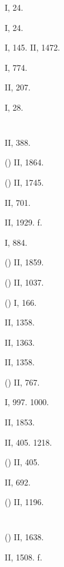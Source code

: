  I, 24.

 I, 24.

 I, 145. II, 1472.

 I, 774.

 II, 207.

 I, 28.

\section{}

 II, 388.

 () II, 1864.

 () II, 1745.

 II, 701.

 II, 1929. f.

 I, 884.

 () II, 1859.

 () II, 1037.

 () I, 166.

 II, 1358.

 II, 1363.

 II, 1358.

 () II, 767.

 I, 997. 1000.

 II, 1853.

 II, 405. 1218.

 () II, 405.

 II, 692.

 () II, 1196.

\section{}

 () II, 1638.

 II, 1508. f.

